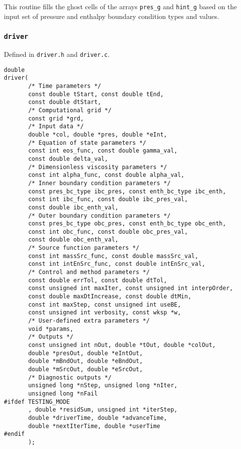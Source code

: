 \documentclass[12pt]{article}
\begin{document}
This routine fills the ghost cells of the arrays \verb=pres_g= and \verb=hint_g= based on the input set of pressure and enthalpy boundary condition types and values.

\subsubsection{\texttt{driver}}
\label{sssec:driver}

Defined in \texttt{driver.h} and \texttt{driver.c}.

\begin{verbatim}
double 
driver(
       /* Time parameters */
       const double tStart, const double tEnd,
       const double dtStart,
       /* Computational grid */
       const grid *grd,
       /* Input data */
       double *col, double *pres, double *eInt,
       /* Equation of state parameters */
       const int eos_func, const double gamma_val, 
       const double delta_val,
       /* Dimensionless viscosity parameters */
       const int alpha_func, const double alpha_val,
       /* Inner boundary condition parameters */
       const pres_bc_type ibc_pres, const enth_bc_type ibc_enth,
       const int ibc_func, const double ibc_pres_val, 
       const double ibc_enth_val,
       /* Outer boundary condition parameters */
       const pres_bc_type obc_pres, const enth_bc_type obc_enth,
       const int obc_func, const double obc_pres_val, 
       const double obc_enth_val,
       /* Source function parameters */
       const int massSrc_func, const double massSrc_val,
       const int intEnSrc_func, const double intEnSrc_val,
       /* Control and method parameters */
       const double errTol, const double dtTol,
       const unsigned int maxIter, const unsigned int interpOrder,
       const double maxDtIncrease, const double dtMin,
       const int maxStep, const unsigned int useBE,
       const unsigned int verbosity, const wksp *w, 
       /* User-defined extra parameters */
       void *params,
       /* Outputs */
       const unsigned int nOut, double *tOut, double *colOut,
       double *presOut, double *eIntOut,
       double *mBndOut, double *eBndOut, 
       double *mSrcOut, double *eSrcOut,
       /* Diagnostic outputs */
       unsigned long *nStep, unsigned long *nIter, 
       unsigned long *nFail
#ifdef TESTING_MODE
       , double *residSum, unsigned int *iterStep,
       double *driverTime, double *advanceTime,
       double *nextIterTime, double *userTime
#endif
       );
\end{verbatim}
\end{document}
